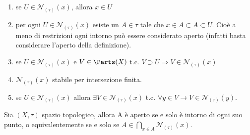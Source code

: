 \documentclass[a4paper]{article}
\begin{document}
\begin{deff}[Intorno]
\begin{center}

\end{center}

\end{deff}



\begin{osss} \mbox{} \par
\begin{enumerate}
	\item se $U \in \mathcal{N} _{(\tau)} (x) $, allora $x \in U$
 	\item per ogni $ U \in \mathcal{N} _{(\tau)}  (x)$ esiste un $ A \in \tau $ tale che $x \in A \subset A \subset U$. Cioè a meno di restrizioni ogni intorno può essere considerato aperto (infatti basta considerare l'aperto della definizione).
 	\item se $U \in \mathcal{N} _{(\tau)}  (x)$ e $ V \in \Parts (X) $ t.c. $V \supset U \Rightarrow V \in \mathcal{N} _{(\tau )} (x)$ 
	\item $\mathcal{N} _{(\tau )} (x) $ stabile per intersezione finita.
	\item se $ U \in \mathcal{N} _{(\tau )} (x) $ allora $\exists V \in \mathcal{N} _{(\tau )} (x) $ t.c. $\forall y \in V \to V \in \mathcal{N} _{(\tau )} (y) $.
\end{enumerate}
\end{osss}

\begin{prop}
Sia $(X,\tau ) $ spazio topologico, allora A è aperto se e solo è intorno di ogni suo punto, o equivalentemente se e solo se $ A \in \bigcap _{x \in A } \mathcal{N} _{(\tau)} (x) $.
\end{prop}
\end{document}
